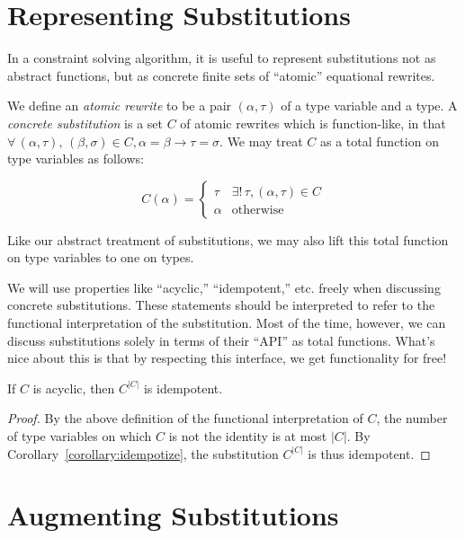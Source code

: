 \documentclass[10pt, letterpaper, oneside]{article}
\begin{document}
\section{Representing Substitutions}

In a constraint solving algorithm, it is useful to represent substitutions not as abstract functions, but as concrete finite sets of ``atomic'' equational rewrites.

We define an \emph{atomic rewrite} to be a pair \((\alpha, \tau)\) of a type variable and a type. A \emph{concrete substitution} is a set \(C\) of atomic rewrites which is function-like, in that \(\forall\, (\alpha, \tau),\,(\beta, \sigma) \in C, \alpha = \beta \to \tau = \sigma\). We may treat \(C\) as a total function on type variables as follows:

\begin{equation*}
  C(\alpha) =
  \begin{cases}
    \tau & \exists!\, \tau, (\alpha, \tau) \in C\\
    \alpha & \textrm{otherwise}
  \end{cases}
\end{equation*}

Like our abstract treatment of substitutions, we may also lift this total function on type variables to one on types.

We will use properties like ``acyclic,'' ``idempotent,'' etc. freely when discussing concrete substitutions. These statements should be interpreted to refer to the functional interpretation of the substitution. Most of the time, however, we can discuss substitutions solely in terms of their ``API'' as total functions. What's nice about this is that by respecting this interface, we get functionality for free!

\begin{corollary}
  If \(C\) is acyclic, then \(C^{|C|}\) is idempotent.
\end{corollary}

\begin{proof}
  By the above definition of the functional interpretation of \(C\), the number of type variables on which \(C\) is not the identity is at most \(|C|\). By Corollary~\ref{corollary:idempotize}, the substitution \(C^{|C|}\) is thus idempotent.
\end{proof}

\section{Augmenting Substitutions}
\end{document}
